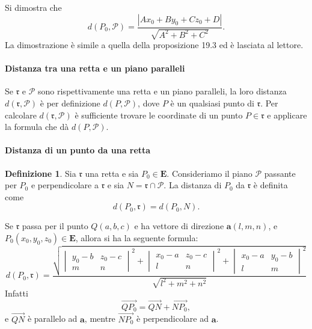 \documentclass{article}
\theoremstyle{plain}
\theoremstyle{definition}
\newtheorem{defn}{Definizione}[section]
\theoremstyle{remark}
\begin{document}
\vspace{10pt}

Si dimostra che
\[
d(P_0, \mathscr{P}) = \frac{\left| A x_0 + B y_0 + C z_0 + D \right|}{\sqrt{A^2 + B^2 + C^2}}.
\]
La dimostrazione è simile a quella della proposizione 19.3 ed è lasciata al lettore.

\vspace{10pt}

\paragraph{Distanza tra una retta e un piano paralleli}
Se $\mathfrak{r}$ e $\mathscr{P}$ sono rispettivamente una retta e un piano paralleli, la loro distanza 
$d(\mathfrak{r},\mathscr{P})$ è per definizione $d(P, \mathscr{P})$, dove $P$ è un qualsiasi punto di 
$\mathfrak{r}$. Per calcolare $d(\mathfrak{r},\mathscr{P})$ è sufficiente trovare le coordinate di un punto
$P \in \mathfrak{r}$ e applicare la formula che dà $d(P, \mathscr{P})$.

\vspace{10pt}

\paragraph{Distanza di un punto da una retta}
\begin{bxthm}
\begin{defn}
Sia $\mathfrak{r}$ una retta e sia $P_0 \in \mathbf{E}$. Consideriamo il piano $\mathscr{P}$ passante per $P_0$ e 
perpendicolare a $\mathfrak{r}$ e sia $N = \mathfrak{r} \cap \mathscr{P}$. La distanza di $P_0$ da $\mathfrak{r}$ è definita come
\[
d(P_0, \mathfrak{r}) = d(P_0, N).
\]    
\end{defn}
\end{bxthm}

\vspace{10pt}

Se $\mathfrak{r}$ passa per il punto $Q(a, b, c)$ e ha vettore di direzione $\mathbf{a}(l, m, n)$, e 
$P_0(x_0, y_0, z_0) \in \mathbf{E}$, allora si ha la seguente formula:
\[
d(P_0, \mathfrak{r}) =
\dfrac{\sqrt{\begin{vmatrix}y_0-b&z_0-c\\m&n\end{vmatrix}^2+\begin{vmatrix}x_0-a&z_0-c\\l&n\end{vmatrix}^2+\begin{vmatrix}x_0-a&y_0-b\\l&m\end{vmatrix}^2}}{\sqrt{l^2 + m^2 + n^2}}
\]
Infatti
\[
\overrightarrow{QP_0} = \overrightarrow{QN} + \overrightarrow{NP_0},
\]
e $\overrightarrow{QN}$ è parallelo ad $\mathbf{a}$, mentre $\overrightarrow{NP_0}$ è perpendicolare ad $\mathbf{a}$.
\end{document}
